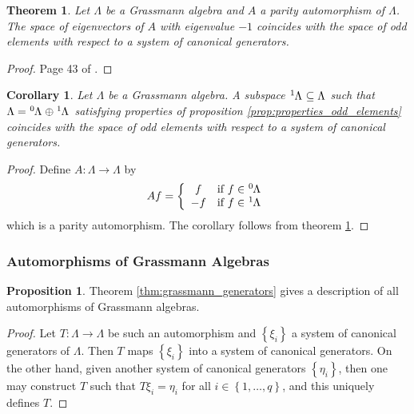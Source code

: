 \documentclass{article}
\newtheorem{theorem}{Theorem}
\newtheorem{corollary}{Corollary}[theorem]
\theoremstyle{definition}
\newtheorem{proposition}{Proposition}
\begin{document}
\begin{theorem}
    \label{thm:parity_aut_generators}
    Let $\Lambda$ be a Grassmann algebra and $A$ a parity automorphism of $\Lambda$. The space of eigenvectors of $A$ with eigenvalue $-1$ coincides with the space of odd elements with respect to a system of canonical generators.
\end{theorem}
\begin{proof}
    Page 43 of \cite{berezin_introduction_1987}.
\end{proof}

\begin{corollary}
    Let $\Lambda$ be a Grassmann algebra. A subspace $\tensor[^1]{\Lambda}{} \subseteq \Lambda$ such that $\Lambda = \tensor[^0]{\Lambda}{} \oplus \tensor[^1]{\Lambda}{}$ satisfying properties of proposition \ref{prop:properties_odd_elements} coincides with the space of odd elements with respect to a system of canonical generators.
\end{corollary}
\begin{proof}
    Define $A: \Lambda \rightarrow \Lambda$ by
    \begin{equation*}
        Af = \left\{
        \begin{array}{cr}
            f & \text{if } f \in \tensor[^0]{\Lambda}{} \\
            -f & \text{if } f \in \tensor[^1]{\Lambda}{}
        \end{array} \right.
    \end{equation*}
    which is a parity automorphism. The corollary follows from theorem \ref{thm:parity_aut_generators}.
\end{proof}


\subsubsection{Automorphisms of Grassmann Algebras}

\begin{proposition}
    Theorem \ref{thm:grassmann_generators} gives a description of all automorphisms of Grassmann algebras.
\end{proposition}
\begin{proof}
    Let $T: \Lambda \rightarrow \Lambda$ be such an automorphism and $\left\{ \xi_i \right\}$ a system of canonical generators of $\Lambda$. Then $T$ maps $\left\{ \xi_i \right\}$ into a system of canonical generators. On the other hand, given another system of canonical generators $\left\{ \eta_i \right\}$, then one may construct $T$ such that $T \xi_i = \eta_i$ for all $i \in \left\{ 1, \dots, q \right\}$, and this uniquely defines $T$.
\end{proof}
\end{document}
